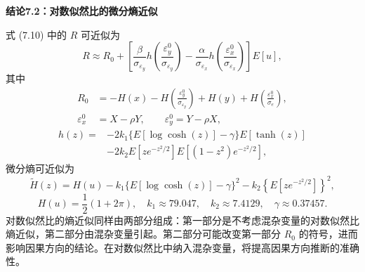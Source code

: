 \par\medskip{}\noindent\textbf{结论7.2：对数似然比的微分熵近似}\par
式 (7.10) 中的 $R$ 可近似为
\begin{equation}
R\approx R_0+\left[\frac\beta{\sigma_{\varepsilon_y}}
h\left(\frac{\varepsilon_y^0}{\sigma_{\varepsilon_y}}\right)
-\frac\alpha{\sigma_{\varepsilon_x}}h\left(\frac{\varepsilon_x^0}{\sigma_{\varepsilon_x}}\right)\right]E[u],
\tag{7.11}
\end{equation}
其中
\[
\begin{aligned}
R_0&=-H(x)-H\left(\frac{\varepsilon_y^0}{\sigma_{\varepsilon_y}}\right)
+H(y)+H\left(\frac{\varepsilon_x^0}{\sigma_e}\right),\\
\varepsilon_x^0&=X-\rho Y,\qquad \varepsilon_y^0=Y-\rho X,
\end{aligned}
\]
\[
\begin{aligned}
h(z)={}&-2k_1\{E[\log\cosh(z)]-\gamma\}E[\tanh(z)]\\
&-2k_2E[ze^{-z^2/2}]E[(1-z^2)e^{-z^2/2}],
\end{aligned}
\]
微分熵可近似为
\[
\widetilde H(z)=H(u)-k_1\{E[\log\cosh(z)]-\gamma\}^2
-k_2\left\{E\left[ze^{-z^2/2}\right]\right\}^2,
\]
\[
H(u)=\frac12(1+2\pi),\quad k_1\approx79.047,\quad k_2\approx7.4129,\quad\gamma\approx0.37457.
\]
对数似然比的熵近似同样由两部分组成：第一部分是不考虑混杂变量的对数似然比熵近似，第二部分由混杂变量引起。第二部分可能改变第一部分 $R_0$ 的符号，进而影响因果方向的结论。在对数似然比中纳入混杂变量，将提高因果方向推断的准确性。
